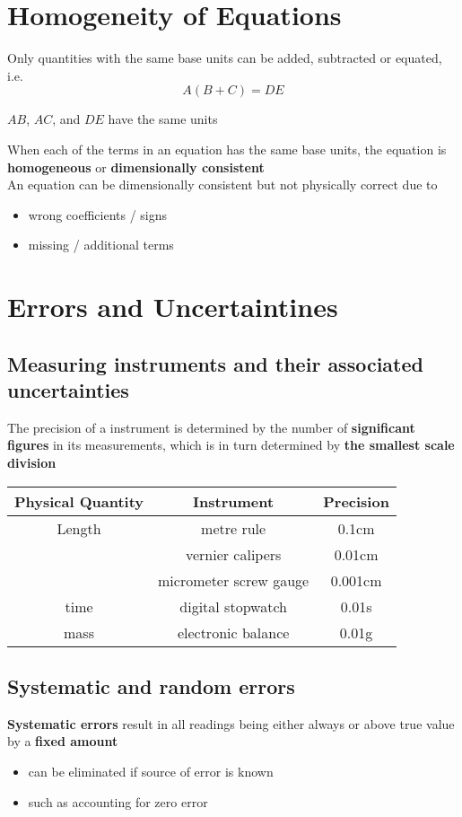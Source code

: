 \documentclass[a4paper, 10pt]{article}
\begin{document}
\section{Homogeneity of Equations}
Only quantities with the same base units can be added, subtracted or equated, i.e.
\[
   A (B+C) =  DE 
\]
\begin{center}
      $AB$, $AC$, and $DE$ have the same units
\end{center}	

When each of the terms in an equation has the same base units, the equation is \textbf{homogeneous} or \textbf{dimensionally consistent} \\

An equation can be dimensionally consistent but not physically correct due to
\begin{itemize}
   \item wrong coefficients / signs 
   \item missing / additional terms
\end{itemize}	

\section{Errors and Uncertaintines}
\subsection{Measuring instruments and their associated uncertainties}
   The precision of a instrument is determined by the number of \textbf{significant figures} in its measurements, which is in turn determined by \textbf{the smallest scale division}
   \begin{center}
      \begin{tabular}{c|c|c}
         \hline
         Physical Quantity & Instrument & Precision \\
         \hline 
         Length & metre rule & 0.1cm \\
                & vernier calipers & 0.01cm  \\
                & micrometer screw gauge & 0.001cm \\
         time & digital stopwatch & 0.01s \\
         mass & electronic balance & 0.01g \\
         \hline
      \end{tabular}
   \end{center}

\subsection{Systematic and random errors}
\textbf{Systematic errors} result in all readings being either always or above true value by a \textbf{fixed amount}
\begin{itemize}
   \item can be eliminated if source of error is known
   \item such as accounting for zero error
\end{itemize}	
\end{document}
